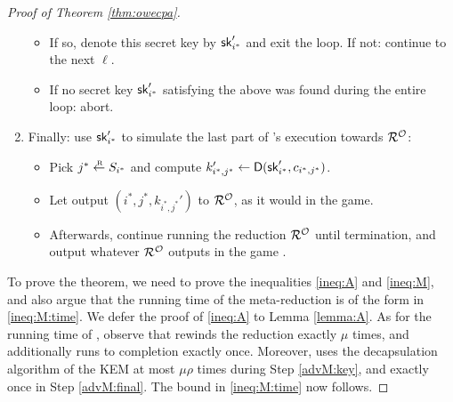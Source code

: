 \begin{proof}[Proof of Theorem \ref{thm:owecpa}]
\begin{enumerate}[itemsep=0.1cm]
\begin{itemize}[label={\textbullet},itemsep=0.1cm]
            \item If so, denote this secret key by \(\mathsf{sk}_{i^{*}}'\) and exit the loop.
                  If not: continue to the next \(\ell\).
            \item If no secret key \(\mathsf{sk}_{i^{*}}'\) satisfying the above
                  was found during the entire loop: abort.
          \end{itemize}
    \item\label{advM:final} Finally: use \(\mathsf{sk}_{i^{*}}'\) to simulate the last part of \advA's execution towards \(\redR^{\oracle}\):
          \begin{itemize}[label={\textbullet},itemsep=0.1cm]
                  \item Pick \(j^{*} \sampleR S_{i^{*}}\) and compute \(k_{i^{*},j^{*}}' \leftarrow \mathsf{D}(\mathsf{sk}_{i^{*}}',c_{i^{*},j^{*}})\).
                  \item Let \advA output \((i^{*},j^{*}, k_{i^{*},j^{*}}')\) to \(\redR^{\oracle}\),
                  as it would in the \OWECPA game.
            \item Afterwards, continue running the reduction \(\redR^{\oracle}\)
                  until termination, and output whatever \(\redR^{\oracle}\)
                  outputs in the game \SICA.
          \end{itemize}
  \end{enumerate}

  To prove the theorem, we need to prove the inequalities \eqref{ineq:A} and \eqref{ineq:M},
  and also argue that the running time of the meta-reduction \redM is of the form in \eqref{ineq:M:time}.
  We defer the proof of \eqref{ineq:A} to Lemma \ref{lemma:A}.
  As for the running time of \redM,
  observe that \redM rewinds the reduction \redR exactly \(\mu\) times,
  and additionally runs \redR to completion exactly once.
  Moreover, \redM uses the decapsulation algorithm \Decaps of the KEM \KEM
  at most \(\mu \rho\) times during Step \ref{advM:key},
  and exactly once in Step \ref{advM:final}.
  The bound in \eqref{ineq:M:time} now follows.


\end{proof}
